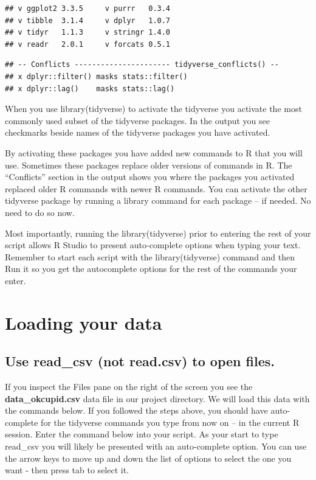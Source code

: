 \documentclass[
]{krantz}
\begin{document}
\begin{verbatim}
## v ggplot2 3.3.5     v purrr   0.3.4
## v tibble  3.1.4     v dplyr   1.0.7
## v tidyr   1.1.3     v stringr 1.4.0
## v readr   2.0.1     v forcats 0.5.1
\end{verbatim}

\begin{verbatim}
## -- Conflicts ---------------------- tidyverse_conflicts() --
## x dplyr::filter() masks stats::filter()
## x dplyr::lag()    masks stats::lag()
\end{verbatim}

When you use library(tidyverse) to activate the tidyverse you activate the most commonly used subset of the tidyverse packages. In the output you see checkmarks beside names of the tidyverse packages you have activated.

By activating these packages you have added new commands to R that you will use. Sometimes these packages replace older versions of commands in R. The ``Conflicts'' section in the output shows you where the packages you activated replaced older R commands with newer R commands. You can activate the other tidyverse package by running a library command for each package -- if needed. No need to do so now.

Most importantly, running the library(tidyverse) prior to entering the rest of your script allows R Studio to present auto-complete options when typing your text. Remember to start each script with the library(tidyverse) command and then Run it so you get the autocomplete options for the rest of the commands your enter.

\hypertarget{loading-your-data}{%
\section{Loading your data}\label{loading-your-data}}

\hypertarget{use-read_csv-not-read.csv-to-open-files.}{%
\subsection{Use read\_csv (not read.csv) to open files.}\label{use-read_csv-not-read.csv-to-open-files.}}

If you inspect the Files pane on the right of the screen you see the \textbf{data\_okcupid.csv} data file in our project directory. We will load this data with the commands below. If you followed the steps above, you should have auto-complete for the tidyverse commands you type from now on -- in the current R session. Enter the command below into your script. As your start to type read\_csv you will likely be presented with an auto-complete option. You can use the arrow keys to move up and down the list of options to select the one you want - then press tab to select it.
\end{document}
